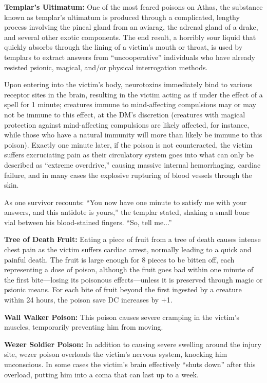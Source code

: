 \textbf{Templar's Ultimatum:} One of the most feared poisons on Athas, the substance known as templar's ultimatum is produced through a complicated, lengthy process involving the pineal gland from an aviarag, the adrenal gland of a drake, and several other exotic components. The end result, a horribly sour liquid that quickly absorbs through the lining of a victim's mouth or throat, is used by templars to extract answers from ``uncooperative'' individuals who have already resisted psionic, magical, and/or physical interrogation methods.

Upon entering into the victim's body, neurotoxins immediately bind to various receptor sites in the brain, resulting in the victim acting as if under the effect of a  spell for 1 minute; creatures immune to mind-affecting compulsions may or may not be immune to this effect, at the DM's discretion (creatures with magical protection against mind-affecting compulsions are likely affected, for instance, while those who have a natural immunity will more than likely be immune to this poison). Exactly one minute later, if the poison is not counteracted, the victim suffers excruciating pain as their circulatory system goes into what can only be described as ``extreme overdrive,'' causing massive internal hemorrhaging, cardiac failure, and in many cases the explosive rupturing of blood vessels through the skin.

As one survivor recounts: ``You now have one minute to satisfy me with your answers, and this antidote is yours,'' the templar stated, shaking a small bone vial between his blood-stained fingers. ``So, tell me...''

\textbf{Tree of Death Fruit:} Eating a piece of fruit from a tree of death causes intense chest pain as the victim suffers cardiac arrest, normally leading to a quick and painful death. The fruit is large enough for 8 pieces to be bitten off, each representing a dose of poison, although the fruit goes bad within one minute of the first bite---losing its poisonous effects---unless it is preserved through magic or psionic means. For each bite of fruit beyond the first ingested by a creature within 24 hours, the poison save DC increases by +1.

\textbf{Wall Walker Poison:} This poison causes severe cramping in the victim's muscles, temporarily preventing him from moving.

\textbf{Wezer Soldier Poison:} In addition to causing severe swelling around the injury site, wezer poison overloads the victim's nervous system, knocking him unconscious. In some cases the victim's brain effectively ``shuts down'' after this overload, putting him into a coma that can last up to a week.

